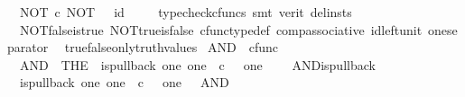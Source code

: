 \begin{isabellebody}
\ \ {\isachardoublequoteopen}NOT\ {\isasymcirc}\isactrlsub c\ NOT\ {\isacharequal}{\kern0pt}\ \ id\ {\isasymOmega}{\isachardoublequoteclose}\isanewline
%
\isadelimproof
\ \ %
\endisadelimproof
%
\isatagproof
{}\isamarkupfalse%
\ {\isacharparenleft}{\kern0pt}typecheck{\isacharunderscore}{\kern0pt}cfuncs{\isacharcomma}{\kern0pt}\ smt\ {\isacharparenleft}{\kern0pt}verit{\isacharcomma}{\kern0pt}\ del{\isacharunderscore}{\kern0pt}insts{\isacharparenright}{\kern0pt}\ \isanewline
\ \ NOT{\isacharunderscore}{\kern0pt}false{\isacharunderscore}{\kern0pt}is{\isacharunderscore}{\kern0pt}true\ NOT{\isacharunderscore}{\kern0pt}true{\isacharunderscore}{\kern0pt}is{\isacharunderscore}{\kern0pt}false\ cfunc{\isacharunderscore}{\kern0pt}type{\isacharunderscore}{\kern0pt}def\ comp{\isacharunderscore}{\kern0pt}associative\ id{\isacharunderscore}{\kern0pt}left{\isacharunderscore}{\kern0pt}unit{}\ one{\isacharunderscore}{\kern0pt}separator\isanewline
\ \ true{\isacharunderscore}{\kern0pt}false{\isacharunderscore}{\kern0pt}only{\isacharunderscore}{\kern0pt}truth{\isacharunderscore}{\kern0pt}values{\isacharparenright}{\kern0pt}%
\endisatagproof
{\isafoldproof}%
%
\isadelimproof
%
\endisadelimproof
%
\isadelimdocument
%
\endisadelimdocument
%
\isatagdocument
%
\isamarkuptrue%
%
\endisatagdocument
{\isafolddocument}%
%
\isadelimdocument
%
\endisadelimdocument
{}\isamarkupfalse%
\ AND\ {\isacharcolon}{\kern0pt}{\isacharcolon}{\kern0pt}\ {\isachardoublequoteopen}cfunc{\isachardoublequoteclose}\ \isanewline
\ \ {\isachardoublequoteopen}AND\ {\isacharequal}{\kern0pt}\ {\isacharparenleft}{\kern0pt}THE\ {\isasymchi}{\isachardot}{\kern0pt}\ is{\isacharunderscore}{\kern0pt}pullback\ one\ one\ {\isacharparenleft}{\kern0pt}{\isasymOmega}\ {\isasymtimes}\isactrlsub c\ {\isasymOmega}{\isacharparenright}{\kern0pt}\ {\isasymOmega}\ {\isacharparenleft}{\kern0pt}{\isasymbeta}\isactrlbsub one\isactrlesub {\isacharparenright}{\kern0pt}\ {\isasymt}\ {\isasymlangle}{\isasymt}{\isacharcomma}{\kern0pt}{\isasymt}{\isasymrangle}\ {\isasymchi}{\isacharparenright}{\kern0pt}{\isachardoublequoteclose}\isanewline
\isanewline
{}\isamarkupfalse%
\ AND{\isacharunderscore}{\kern0pt}is{\isacharunderscore}{\kern0pt}pullback{\isacharcolon}{\kern0pt}\isanewline
\ \ {\isachardoublequoteopen}is{\isacharunderscore}{\kern0pt}pullback\ one\ one\ {\isacharparenleft}{\kern0pt}{\isasymOmega}\ {\isasymtimes}\isactrlsub c\ {\isasymOmega}{\isacharparenright}{\kern0pt}\ {\isasymOmega}\ {\isacharparenleft}{\kern0pt}{\isasymbeta}\isactrlbsub one\isactrlesub {\isacharparenright}{\kern0pt}\ {\isasymt}\ {\isasymlangle}{\isasymt}{\isacharcomma}{\kern0pt}{\isasymt}{\isasymrangle}\ AND{\isachardoublequoteclose}\isanewline

\end{isabellebody}

